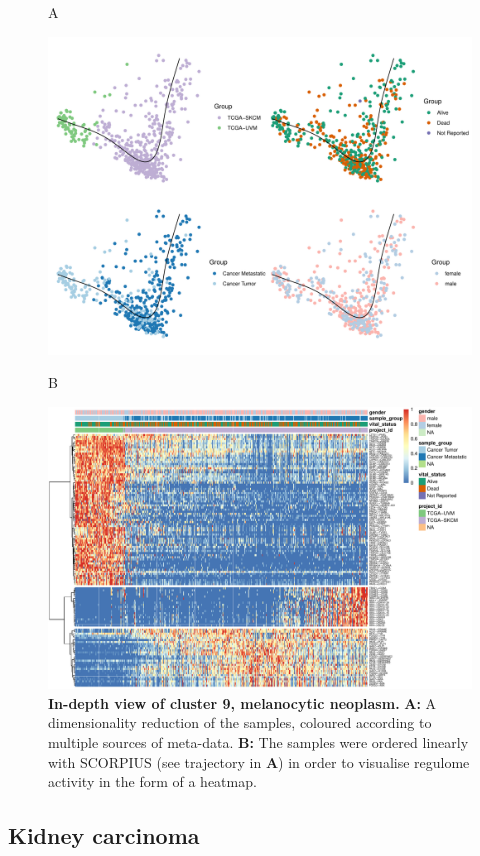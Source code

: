 \begin{figure}[H]
	A
	\begin{center}\includegraphics[width=.85\linewidth]{fig/tcga/zoom_cluster9_melanocytic-neoplasm_plot.pdf}\end{center}
	B
	\begin{center}\includegraphics[width=.85\linewidth]{fig/tcga/zoom_cluster9_melanocytic-neoplasm_heatmap.pdf}\end{center}
	\caption{
		\textbf{In-depth view of cluster 9, melanocytic neoplasm.} 
		\textbf{A:} A dimensionality reduction of the samples, coloured according to multiple sources of meta-data. 
		\textbf{B:} The samples were ordered linearly with SCORPIUS (see trajectory in \textbf{A}) in order to visualise regulome activity in the form of a heatmap.
	}
	\label{fig:zoom9}
\end{figure}


\subsection{Kidney carcinoma}

